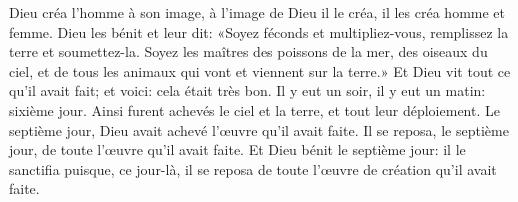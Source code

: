 Dieu créa l’homme à son image,
	à l’image de Dieu il le créa, il les créa homme et femme.
Dieu les bénit et leur dit:
	«Soyez féconds et multipliez-vous, remplissez la terre et soumettez-la.
	Soyez les maîtres des poissons de la mer, des oiseaux du ciel,
	et de tous les animaux qui vont et viennent sur la terre.»
Et Dieu vit tout ce qu’il avait fait; et voici: cela était très bon.
Il y eut un soir, il y eut un matin: sixième jour.
Ainsi furent achevés le ciel et la terre, et tout leur déploiement.
Le septième jour, Dieu avait achevé l’œuvre qu’il avait faite.
Il se reposa, le septième jour, de toute l’œuvre qu’il avait faite.
Et Dieu bénit le septième jour: il le sanctifia puisque, ce jour-là,
	il se reposa de toute l’œuvre de création qu’il avait faite.

